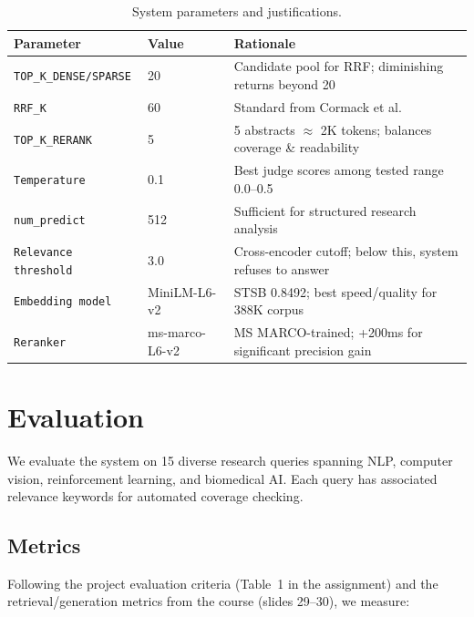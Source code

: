 \documentclass[11pt,a4paper]{article}
\begin{document}
\begin{table}[h]
\centering
\small
\caption{System parameters and justifications.}
\label{tab:params}
\begin{tabular}{@{}lll@{}}
\toprule
\textbf{Parameter} & \textbf{Value} & \textbf{Rationale} \\
\midrule
\texttt{TOP\_K\_DENSE/SPARSE} & 20 & Candidate pool for RRF; diminishing returns beyond 20 \\
\texttt{RRF\_K} & 60 & Standard from Cormack et al.~\cite{cormack2009} \\
\texttt{TOP\_K\_RERANK} & 5 & 5 abstracts $\approx$ 2K tokens; balances coverage \& readability \\
\texttt{Temperature} & 0.1 & Best judge scores among tested range 0.0--0.5 \\
\texttt{num\_predict} & 512 & Sufficient for structured research analysis \\
\texttt{Relevance threshold} & 3.0 & Cross-encoder cutoff; below this, system refuses to answer \\
\texttt{Embedding model} & MiniLM-L6-v2 & STSB 0.8492; best speed/quality for 388K corpus \\
\texttt{Reranker} & ms-marco-L6-v2 & MS MARCO-trained; +200ms for significant precision gain \\
\bottomrule
\end{tabular}
\end{table}

\section{Evaluation}

We evaluate the system on 15 diverse research queries spanning NLP, computer vision, reinforcement learning, and biomedical AI. Each query has associated relevance keywords for automated coverage checking.

\subsection{Metrics}

Following the project evaluation criteria (Table~1 in the assignment) and the retrieval/generation metrics from the course (slides 29--30), we measure:
\end{document}
